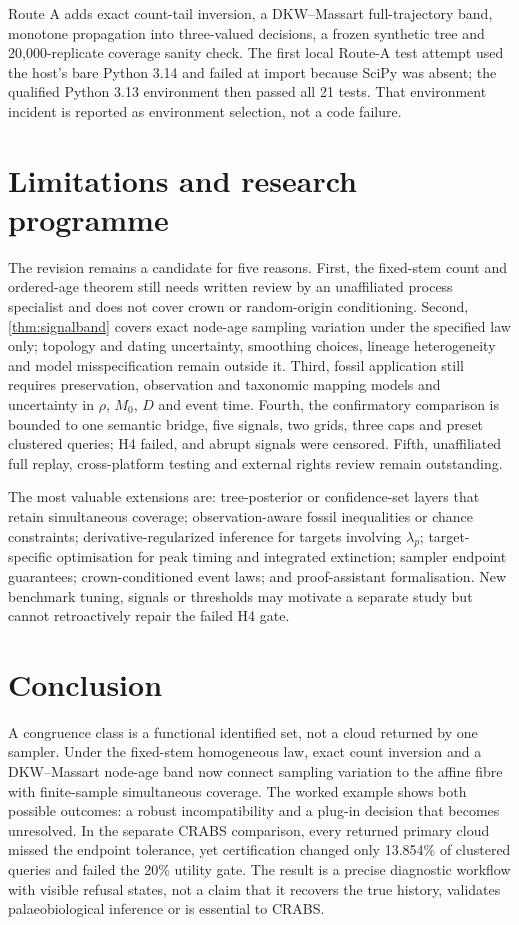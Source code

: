 \documentclass[11pt]{article}
\theoremstyle{definition}
\begin{document}
Route A adds exact count-tail inversion, a DKW--Massart full-trajectory band, monotone propagation into three-valued decisions, a frozen synthetic tree and 20,000-replicate coverage sanity check. The first local Route-A test attempt used the host's bare Python 3.14 and failed at import because SciPy was absent; the qualified Python 3.13 environment then passed all 21 tests. That environment incident is reported as environment selection, not a code failure.

\section{Limitations and research programme}
The revision remains a candidate for five reasons. First, the fixed-stem count and ordered-age theorem still needs written review by an unaffiliated process specialist and does not cover crown or random-origin conditioning. Second, \cref{thm:signalband} covers exact node-age sampling variation under the specified law only; topology and dating uncertainty, smoothing choices, lineage heterogeneity and model misspecification remain outside it. Third, fossil application still requires preservation, observation and taxonomic mapping models and uncertainty in $\rho$, $M_0$, $D$ and event time. Fourth, the confirmatory comparison is bounded to one semantic bridge, five signals, two grids, three caps and preset clustered queries; H4 failed, and abrupt signals were censored. Fifth, unaffiliated full replay, cross-platform testing and external rights review remain outstanding.

The most valuable extensions are: tree-posterior or confidence-set layers that retain simultaneous coverage; observation-aware fossil inequalities or chance constraints; derivative-regularized inference for targets involving $\lambda_p$; target-specific optimisation for peak timing and integrated extinction; sampler endpoint guarantees; crown-conditioned event laws; and proof-assistant formalisation. New benchmark tuning, signals or thresholds may motivate a separate study but cannot retroactively repair the failed H4 gate.

\section{Conclusion}
A congruence class is a functional identified set, not a cloud returned by one sampler. Under the fixed-stem homogeneous law, exact count inversion and a DKW--Massart node-age band now connect sampling variation to the affine fibre with finite-sample simultaneous coverage. The worked example shows both possible outcomes: a robust incompatibility and a plug-in decision that becomes unresolved. In the separate CRABS comparison, every returned primary cloud missed the endpoint tolerance, yet certification changed only 13.854\% of clustered queries and failed the 20\% utility gate. The result is a precise diagnostic workflow with visible refusal states, not a claim that it recovers the true history, validates palaeobiological inference or is essential to CRABS.
\end{document}
